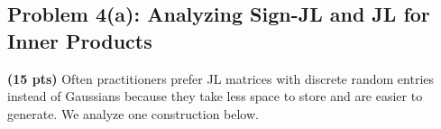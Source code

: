 \documentclass[10pt]{article}
\begin{document}

\subsection{Problem 4(a): Analyzing Sign-JL and JL for Inner Products }
\textbf{(15 pts)}
Often practitioners prefer JL matrices with discrete random entries instead of Gaussians because they take less space to store and are easier to generate. We  analyze one construction below.
\end{document}
